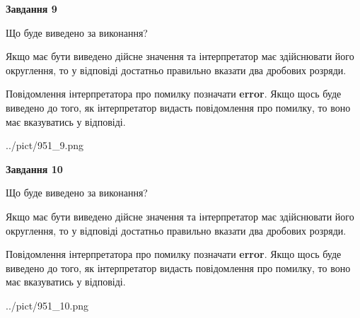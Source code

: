 \documentclass[12pt, ukrainian]{article}
\begin{document}
{\begin {Large}
{\begin {center}\textbf{Завдання 9}\end {center}}\par
Що буде виведено за виконання? \par

Якщо має бути виведено дійсне значення та інтерпретатор має здійснювати його округлення, 
то у відповіді достатньо правильно вказати два дробових розряди.

Повідомлення інтерпретатора про помилку позначати \textbf{error}.
Якщо щось буде виведено до того, як інтерпретатор видасть повідомлення про помилку, 
то воно має вказуватись у відповіді. \par

\begin{center}
	{../pict/951_9.png}
\end{center}
\newpage

{\begin {center}\textbf{Завдання 10}\end {center}}\par
Що буде виведено за виконання? \par

Якщо має бути виведено дійсне значення та інтерпретатор має здійснювати його округлення, 
то у відповіді достатньо правильно вказати два дробових розряди.

Повідомлення інтерпретатора про помилку позначати \textbf{error}.
Якщо щось буде виведено до того, як інтерпретатор видасть повідомлення про помилку, 
то воно має вказуватись у відповіді. \par

\begin{center}
	{../pict/951_10.png}
\end{center}
\newpage

\end {Large}}
\end{document}
